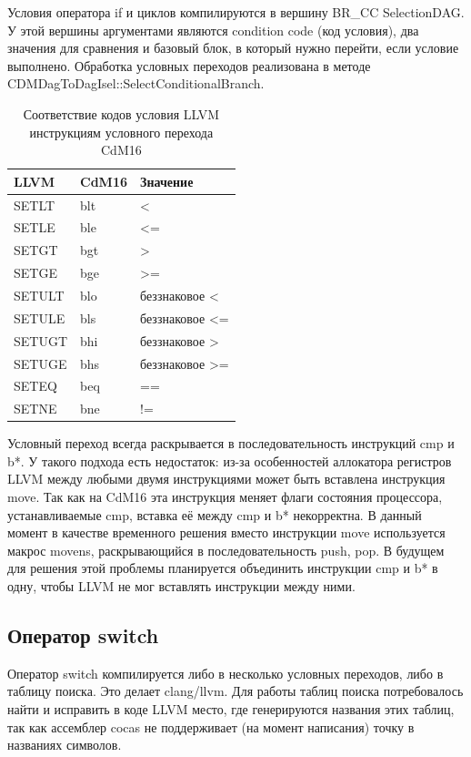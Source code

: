 \documentclass[a4paper,14pt]{extarticle}
\begin{document}
Условия оператора if и циклов компилируются в вершину BR\_CC SelectionDAG. У этой вершины аргументами являются condition code (код условия), два значения для сравнения и базовый блок, в который нужно перейти, если условие выполнено. Обработка условных переходов реализована в методе CDMDagToDagIsel::SelectConditionalBranch.
\begin{table}[!h]
	\begin{center}
		\begin{tabular}{ |l|l|l|  }
			\hline
			LLVM & CdM16 & Значение \\
			\hline
			SETLT & blt & < \\
			SETLE & ble & <= \\
			SETGT & bgt & > \\
			SETGE & bge & >= \\
			SETULT & blo & беззнаковое < \\
			SETULE & bls & беззнаковое <= \\
			SETUGT & bhi & беззнаковое > \\
			SETUGE & bhs & беззнаковое >= \\
			SETEQ & beq & ==\\
			SETNE & bne & != \\

			\hline
		\end{tabular}
		\caption{Соответствие кодов условия LLVM инструкциям условного перехода CdM16}
	\end{center}
\end{table}
Условный переход всегда раскрывается в последовательность инструкций cmp и b*. У такого подхода есть недостаток: из-за особенностей аллокатора регистров LLVM между любыми двумя инструкциями может быть вставлена инструкция move. Так как на CdM16 эта инструкция меняет флаги состояния процессора, устанавливаемые cmp, вставка её между cmp и b* некорректна. В данный момент в качестве временного решения вместо инструкции move используется макрос movens, раскрывающийся в последовательность push, pop. В будущем для решения этой проблемы планируется объединить инструкции cmp и b* в одну, чтобы LLVM не мог вставлять инструкции между ними.

\subsection{Оператор switch}

Оператор switch компилируется либо в несколько условных переходов, либо в таблицу поиска. Это делает clang/llvm. Для работы таблиц поиска потребовалось найти и исправить в коде LLVM место, где генерируются названия этих таблиц, так как ассемблер cocas не поддерживает (на момент написания) точку в названиях символов.
\end{document}
